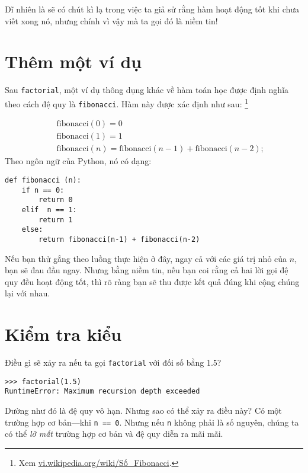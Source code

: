 \documentclass[11pt]{book}
\begin{document}
Dĩ nhiên là sẽ có chút kì lạ trong việc ta giả sử rằng hàm hoạt động tốt 
khi chưa viết xong nó, nhưng chính vì vậy mà ta gọi đó là niềm tin!


\section{Thêm một ví dụ}
\label{one more example}


Sau {\tt factorial}, một ví dụ thông dụng khác về hàm toán học
được định nghĩa theo cách đệ quy là {\tt fibonacci}. Hàm này 
được xác định như sau:
\footnote{Xem 
  \url{vi.wikipedia.org/wiki/Số_Fibonacci}.}

\vspace{-0.25in}
\begin{eqnarray*}
&& \mathrm{fibonacci}(0) = 0 \\
&& \mathrm{fibonacci}(1) = 1 \\
&& \mathrm{fibonacci}(n) = \mathrm{fibonacci}(n-1) + \mathrm{fibonacci}(n-2);
\end{eqnarray*}
%
Theo ngôn ngữ của Python, nó có dạng:

\beforeverb
\begin{verbatim}
def fibonacci (n):
    if n == 0:
        return 0
    elif  n == 1:
        return 1
    else:
        return fibonacci(n-1) + fibonacci(n-2)
\end{verbatim}
\afterverb
%
Nếu bạn thử gắng theo luồng thực hiện ở đây, ngay cả với các
giá trị nhỏ của $n$, bạn sẽ đau đầu ngay. Nhưng bằng 
niềm tin, nếu bạn coi rằng cả hai lời gọi đệ quy đều hoạt động
tốt, thì rõ ràng bạn sẽ thu được kết quả đúng khi cộng chúng
lại với nhau.



\section{Kiểm tra kiểu}
\label{guardian}


Điều gì sẽ xảy ra nếu ta gọi {\tt factorial} với đối số bằng 1.5?


\beforeverb
\begin{verbatim}
>>> factorial(1.5)
RuntimeError: Maximum recursion depth exceeded
\end{verbatim}
\afterverb
%
Dường như đó là đệ quy vô hạn. Nhưng sao có thể xảy ra điều này?
Có một trường hợp cơ bản---khi {\tt n == 0}.  Nhưng nếu {\tt n} 
không phải là số nguyên, chúng ta có thể {\em lỡ mất} trường hợp
cơ bản và đệ quy diễn ra mãi mãi.
\end{document}
